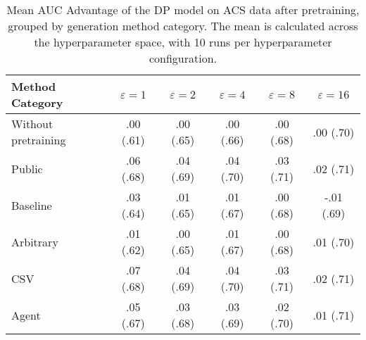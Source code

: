 \begin{table}[h!]
    \centering
    \caption{Mean AUC Advantage of the DP model on ACS data after pretraining, grouped by generation method category. The mean is calculated across the hyperparameter space, with 10 runs per hyperparameter configuration.}
    \label{tab:epsilon_comparison}
    \begin{tabular}{lccccc}
    \toprule
    Method Category & $\varepsilon=1$ & $\varepsilon=2$ & $\varepsilon=4$ & $\varepsilon=8$ & $\varepsilon=16$ \\
    \midrule
    Without pretraining & .00 {\small (.61)} & .00 {\small (.65)} & .00 {\small (.66)} & .00 {\small (.68)} & .00 {\small (.70)} \\
    \arrayrulecolor{black!50!}\midrule
    Public & \cellcolor{silver!30}.06 {\small (.68)} & \cellcolor{silver!30}.04 {\small (.69)} & \cellcolor{silver!30}.04 {\small (.70)} & \cellcolor{silver!30}.03 {\small (.71)} & \cellcolor{gold!30}.02 {\small (.71)} \\
    \arrayrulecolor{black!50!}\midrule
    Baseline & .03 {\small (.64)} & .01 {\small (.65)} & .01 {\small (.67)} & .00 {\small (.68)} & -.01 {\small (.69)} \\
    \arrayrulecolor{black!50!}\midrule
    Arbitrary & .01 {\small (.62)} & .00 {\small (.65)} & .01 {\small (.67)} & .00 {\small (.68)} & .01 {\small (.70)} \\
    \arrayrulecolor{black!50!}\midrule
    CSV & \cellcolor{gold!30}.07 {\small (.68)} & \cellcolor{gold!30}.04 {\small (.69)} & \cellcolor{gold!30}.04 {\small (.70)} & \cellcolor{gold!30}.03 {\small (.71)} & \cellcolor{silver!30}.02 {\small (.71)} \\
    Agent & \cellcolor{bronze!30}.05 {\small (.67)} & \cellcolor{bronze!30}.03 {\small (.68)} & \cellcolor{bronze!30}.03 {\small (.69)} & \cellcolor{bronze!30}.02 {\small (.70)} & \cellcolor{bronze!30}.01 {\small (.71)} \\
    \bottomrule
    \end{tabular}
\end{table}